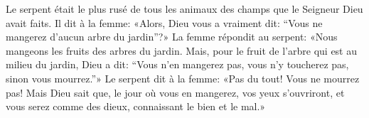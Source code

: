 Le serpent était le plus rusé
		de tous les animaux des champs que le Seigneur Dieu avait faits.
Il dit à la femme:
	«Alors, Dieu vous a vraiment dit:
	“Vous ne mangerez d’aucun arbre du jardin”?»
La femme répondit au serpent:
	«Nous mangeons les fruits des arbres du jardin.
	Mais, pour le fruit de l’arbre qui est au milieu du jardin, Dieu a dit:
	“Vous n’en mangerez pas, vous n’y toucherez pas, sinon vous mourrez.”»
Le serpent dit à la femme: «Pas du tout! Vous ne mourrez pas!
	Mais Dieu sait que, le jour où vous en mangerez, vos yeux s’ouvriront,
	et vous serez comme des dieux, connaissant le bien et le mal.»
